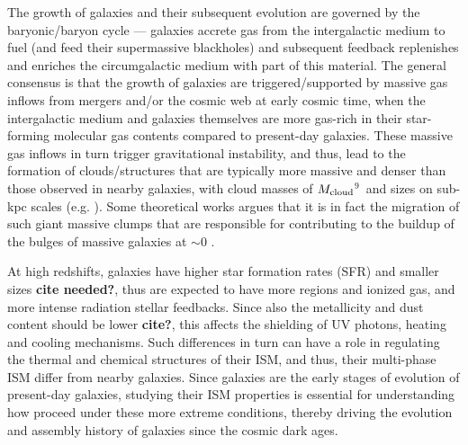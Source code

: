 \documentclass[apj]{emulateapj} %
\begin{document}
The growth of galaxies and their subsequent evolution are governed by the baryonic/baryon cycle ---
galaxies accrete gas from the intergalactic medium to fuel \SF (and feed their supermassive blackholes)
and subsequent feedback replenishes and enriches the circumgalactic medium with part of this material.
The general consensus is that the growth of \highz galaxies are triggered/supported by massive
gas inflows from mergers and/or the cosmic web at early cosmic time, when the intergalactic
medium and galaxies themselves are more gas-rich in their star-forming molecular
gas contents compared to present-day galaxies.
These massive gas inflows in turn trigger gravitational instability, and thus, lead
to the formation of clouds/structures that are typically more massive and denser than those
observed in nearby galaxies, with cloud masses of $M_{\rm cloud}$$^9$\,\Msun
and sizes on sub-kpc scales (e.g. \citealt{Gabor13a, Hopkins14a, Inoue16a}).
Some theoretical works argues that it is in fact the
migration of such giant massive clumps that are responsible for contributing to the
buildup of the bulges of massive galaxies at \z$\sim$0 \citep[e.g.,][]{Ceverino10a}.

At high redshifts, galaxies have higher star formation rates (SFR) and smaller sizes {\bf cite needed?}, thus are expected to have more  regions and ionized gas, and more intense radiation stellar feedbacks. Since also the metallicity and dust content should be lower {\bf cite?}, this affects the shielding of UV photons, heating and cooling mechanisms. Such differences in turn can have a role in regulating the thermal and chemical structures of their ISM, and thus, their multi-phase ISM differ from nearby galaxies.
%
Since \highz galaxies are the early stages of evolution of present-day galaxies, studying their ISM properties is essential for understanding how \SF proceed under these more extreme conditions, thereby driving the evolution and assembly history of galaxies since the cosmic dark ages.
\end{document}
